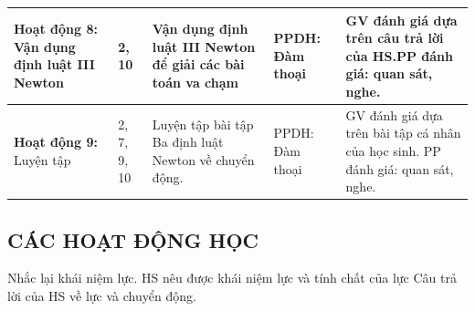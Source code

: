 \begin{center}
\begin{longtable}{|L{2.75cm}|C{1.25cm}|L{5cm}|L{3.5cm}|L{4cm}|}
		\hline
		\textbf{Hoạt động 8:} Vận dụng định luật III Newton & 2, 10 & Vận dụng định luật III Newton để giải các bài toán va chạm & PPDH: Đàm thoại  &GV đánh giá dựa trên câu trả lời của HS.\newline PP đánh giá: quan sát, nghe.  \\
		\hline
		\textbf{Hoạt động 9:} Luyện tập	& 2, 7, 9, 10  & Luyện tập bài tập Ba định luật Newton về chuyển động. & PPDH:  Đàm thoại& GV đánh giá dựa trên bài tập cá nhân của học sinh.\newline
		PP đánh giá: quan sát, nghe. \\
		\hline
	\end{longtable}
\end{center}
\subsection{CÁC HOẠT ĐỘNG HỌC}
\hoatdong
{Nhắc lại khái niệm lực.
}
{HS nêu được khái niệm lực và tính chất của lực
}
{Câu trả lời của HS về lực và chuyển động.
}
